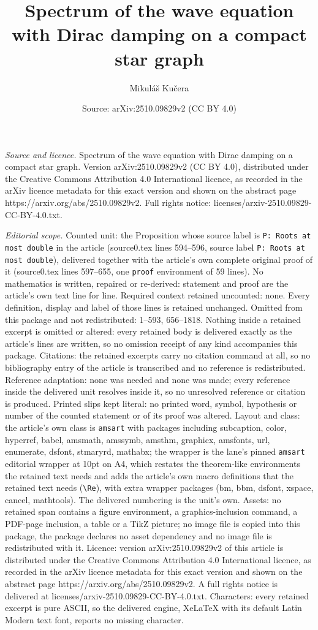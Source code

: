 \documentclass[10pt,a4paper]{amsart}
\title[Spectrum of the wave equation with Dirac damping on a compac]{Spectrum of the wave equation with Dirac damping on a compact star graph}
\author{Mikul\'a\v{s} Ku\v{c}era}
\date{Source: arXiv:2510.09829v2 (CC BY 4.0)}
\begin{document}
\maketitle

\noindent\emph{Source and licence.} Spectrum of the wave equation with Dirac damping on a compact star graph. Version arXiv:2510.09829v2 (CC BY 4.0), distributed under the Creative Commons Attribution 4.0 International licence, as recorded in the arXiv licence metadata for this exact version and shown on the abstract page https://arxiv.org/abs/2510.09829v2. Full rights notice: licenses/arxiv-2510.09829-CC-BY-4.0.txt.\par\smallskip

\noindent\textit{Editorial scope.} Counted unit: the Proposition whose source label is \texttt{P: Roots at most double} in the article (source0.tex lines 594--596, source label \texttt{P: Roots at most double}), delivered together with the article's own complete original proof of it (source0.tex lines 597--655, one \texttt{proof} environment of 59 lines). No mathematics is written, repaired or re-derived: statement and proof are the article's own text line for line. Required context retained uncounted: none. Every definition, display and label of those lines is retained unchanged. Omitted from this package and not redistributed: 1--593, 656--1818. Nothing inside a retained excerpt is omitted or altered: every retained body is delivered exactly as the article's lines are written, so no omission receipt of any kind accompanies this package. Citations: the retained excerpts carry no citation command at all, so no bibliography entry of the article is transcribed and no reference is redistributed. Reference adaptation: none was needed and none was made; every reference inside the delivered unit resolves inside it, so no unresolved reference or citation is produced. Printed slips kept literal: no printed word, symbol, hypothesis or number of the counted statement or of its proof was altered. Layout and class: the article's own class is \texttt{amsart} with packages including subcaption, color, hyperref, babel, amsmath, amssymb, amsthm, graphicx, amsfonts, url, enumerate, dsfont, stmaryrd, mathabx; the wrapper is the lane's pinned \texttt{amsart} editorial wrapper at 10pt on A4, which restates the theorem-like environments the retained text needs and adds the article's own macro definitions that the retained text needs (\texttt{\textbackslash Re}), with extra wrapper packages (bm, bbm, dsfont, xspace, cancel, mathtools). The delivered numbering is the unit's own. Assets: no retained span contains a figure environment, a graphics-inclusion command, a PDF-page inclusion, a table or a TikZ picture; no image file is copied into this package, the package declares no asset dependency and no image file is redistributed with it. Licence: version arXiv:2510.09829v2 of this article is distributed under the Creative Commons Attribution 4.0 International licence, as recorded in the arXiv licence metadata for this exact version and shown on the abstract page https://arxiv.org/abs/2510.09829v2. A full rights notice is delivered at licenses/arxiv-2510.09829-CC-BY-4.0.txt. Characters: every retained excerpt is pure ASCII, so the delivered engine, XeLaTeX with its default Latin Modern text font, reports no missing character.
\end{document}
